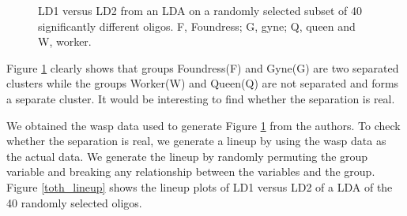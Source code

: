 \begin{figure}[hbtp]
   \centering
       \caption{LD1 versus LD2 from an LDA on a randomly selected subset of 40 significantly different oligos. F, Foundress; G, gyne; Q, queen and W, worker.}
     \label{oligo}
\end{figure}  

Figure \ref{oligo} clearly shows that groups Foundress(F) and Gyne(G) are two separated clusters while the groups Worker(W) and Queen(Q) are not separated and forms a separate cluster. It would be interesting to find whether the separation is real.

We obtained the wasp data used to generate Figure \ref{oligo} from the authors. To check whether the separation is real, we generate a lineup by using the wasp data as the actual data. We generate the lineup by randomly permuting the group variable and breaking any relationship between the variables  and the group. Figure \ref{toth_lineup} shows the lineup plots of LD1 versus LD2 of a LDA of the 40 randomly selected oligos.

